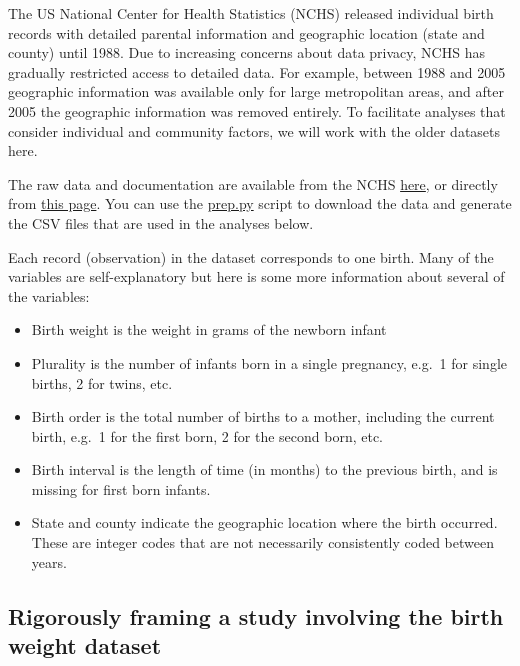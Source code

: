 The US National Center for Health Statistics (NCHS) released individual birth records with detailed parental information and geographic location (state and county) until 1988.  Due to increasing concerns about data privacy, NCHS has gradually restricted access to detailed data.  For example, between 1988 and 2005 geographic information was available only for large metropolitan areas, and after 2005 the geographic information was removed entirely.  To facilitate analyses that consider individual and community factors, we will work with the older datasets here.

The raw data and documentation are available from the NCHS \href{https://www.cdc.gov/nchs/data_access/vitalstatsonline.htm}{here}, or directly from \href{https://ftp.cdc.gov/pub/Health_Statistics/NCHS/Datasets/DVS/natality}{this page}.  You can use the \href{https://github.com/kshedden/case_studies/blob/main/birthweight/prep.py}{prep.py} script to download the data and generate the CSV files that are used in the analyses below.

Each record (observation) in the dataset corresponds to one birth.  Many of the variables are self-explanatory but here is some more information about several of the variables:

\begin{itemize}

\item Birth weight is the weight in grams of the newborn infant

\item Plurality is the number of infants born in a single pregnancy, e.g.\ 1 for single births, 2 for twins, etc.

\item Birth order is the total number of births to a mother, including the current birth, e.g.\ 1 for the first born, 2 for the second born, etc.

\item Birth interval is the length of time (in months) to the previous birth, and is missing for first born infants.

\item State and county indicate the geographic location where the birth occurred.  These are integer codes that are not necessarily consistently coded between years.

\end{itemize}

\subsection{Rigorously framing a study involving the birth weight dataset}

